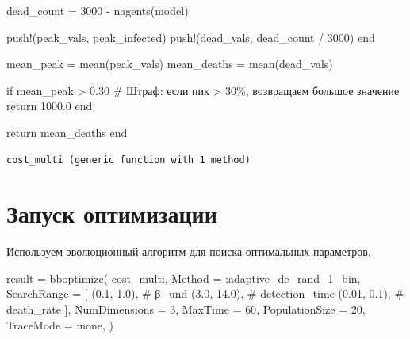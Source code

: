 \documentclass[
  12pt,
  a4paper,
  DIV=11,
  numbers=noendperiod]{scrreprt}
\newenvironment{Shaded}{\begin{snugshade}}{\end{snugshade}}
\newcommand{\CommentTok}[1]{\textcolor[rgb]{0.37,0.37,0.37}{#1}}
\newcommand{\ControlFlowTok}[1]{\textcolor[rgb]{0.00,0.23,0.31}{#1}}
\newcommand{\FloatTok}[1]{\textcolor[rgb]{0.68,0.00,0.00}{#1}}
\newcommand{\FunctionTok}[1]{\textcolor[rgb]{0.28,0.35,0.67}{#1}}
\newcommand{\NormalTok}[1]{\textcolor[rgb]{0.00,0.23,0.31}{#1}}
\newcommand{\OperatorTok}[1]{\textcolor[rgb]{0.37,0.37,0.37}{#1}}
\begin{document}
\begin{Shaded}
\begin{Highlighting}[]
\NormalTok{        dead\_count }\OperatorTok{=} \FloatTok{3000} \OperatorTok{{-}} \FunctionTok{nagents}\NormalTok{(model)}

        \FunctionTok{push!}\NormalTok{(peak\_vals, peak\_infected)}
        \FunctionTok{push!}\NormalTok{(dead\_vals, dead\_count }\OperatorTok{/} \FloatTok{3000}\NormalTok{)}
    \ControlFlowTok{end}

\NormalTok{    mean\_peak }\OperatorTok{=} \FunctionTok{mean}\NormalTok{(peak\_vals)}
\NormalTok{    mean\_deaths }\OperatorTok{=} \FunctionTok{mean}\NormalTok{(dead\_vals)}

    \ControlFlowTok{if}\NormalTok{ mean\_peak }\OperatorTok{\textgreater{}} \FloatTok{0.30} \CommentTok{\# Штраф: если пик \textgreater{} 30\%, возвращаем большое значение}
        \ControlFlowTok{return} \FloatTok{1000.0}
    \ControlFlowTok{end}

    \ControlFlowTok{return}\NormalTok{ mean\_deaths}
\ControlFlowTok{end}
\end{Highlighting}
\end{Shaded}

\begin{verbatim}
cost_multi (generic function with 1 method)
\end{verbatim}

\section{Запуск
оптимизации}\label{ux437ux430ux43fux443ux441ux43a-ux43eux43fux442ux438ux43cux438ux437ux430ux446ux438ux438}

Используем эволюционный алгоритм для поиска оптимальных параметров.

\begin{Shaded}
\begin{Highlighting}[]
\NormalTok{result }\OperatorTok{=} \FunctionTok{bboptimize}\NormalTok{(}
\NormalTok{    cost\_multi,}
\NormalTok{    Method }\OperatorTok{=} \OperatorTok{:}\NormalTok{adaptive\_de\_rand\_1\_bin,}
\NormalTok{    SearchRange }\OperatorTok{=}\NormalTok{ [}
\NormalTok{        (}\FloatTok{0.1}\NormalTok{, }\FloatTok{1.0}\NormalTok{),   }\CommentTok{\# β\_und}
\NormalTok{        (}\FloatTok{3.0}\NormalTok{, }\FloatTok{14.0}\NormalTok{),  }\CommentTok{\# detection\_time}
\NormalTok{        (}\FloatTok{0.01}\NormalTok{, }\FloatTok{0.1}\NormalTok{),  }\CommentTok{\# death\_rate}
\NormalTok{    ],}
\NormalTok{    NumDimensions }\OperatorTok{=} \FloatTok{3}\NormalTok{,}
\NormalTok{    MaxTime }\OperatorTok{=} \FloatTok{60}\NormalTok{,}
\NormalTok{    PopulationSize }\OperatorTok{=} \FloatTok{20}\NormalTok{,}
\NormalTok{    TraceMode }\OperatorTok{=} \OperatorTok{:}\NormalTok{none,}
\NormalTok{)}
\end{Highlighting}
\end{Shaded}
\end{document}
